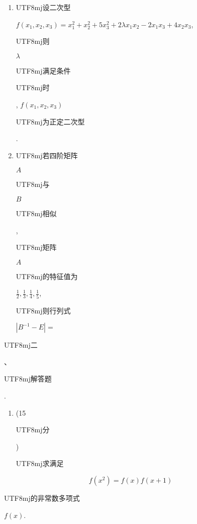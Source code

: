 \documentclass[10pt]{article}
\begin{document}
\begin{enumerate}
  \item \begin{CJK}{UTF8}{mj}设二次型\end{CJK} $f\left(x_{1}, x_{2}, x_{3}\right)=x_{1}^{2}+x_{2}^{2}+5 x_{3}^{2}+2 \lambda x_{1} x_{2}-2 x_{1} x_{3}+4 x_{2} x_{3}$, \begin{CJK}{UTF8}{mj}则\end{CJK} $\lambda$ \begin{CJK}{UTF8}{mj}满足条件\end{CJK} \begin{CJK}{UTF8}{mj}时\end{CJK}, $f\left(x_{1}, x_{2}, x_{3}\right)$ \begin{CJK}{UTF8}{mj}为正定二次型\end{CJK}.

  \item \begin{CJK}{UTF8}{mj}若四阶矩阵\end{CJK} $A$ \begin{CJK}{UTF8}{mj}与\end{CJK} $B$ \begin{CJK}{UTF8}{mj}相似\end{CJK}, \begin{CJK}{UTF8}{mj}矩阵\end{CJK} $A$ \begin{CJK}{UTF8}{mj}的特征值为\end{CJK} $\frac{1}{2}, \frac{1}{3}, \frac{1}{4}, \frac{1}{5}$, \begin{CJK}{UTF8}{mj}则行列式\end{CJK} $\left|B^{-1}-E\right|=$

\end{enumerate}
\begin{CJK}{UTF8}{mj}二\end{CJK}、\begin{CJK}{UTF8}{mj}解答题\end{CJK}.

\begin{enumerate}
  \item (15 \begin{CJK}{UTF8}{mj}分\end{CJK}) \begin{CJK}{UTF8}{mj}求满足\end{CJK}
\end{enumerate}
$$
f\left(x^{2}\right)=f(x) f(x+1)
$$
\begin{CJK}{UTF8}{mj}的非常数多项式\end{CJK} $f(x)$.
\end{document}
